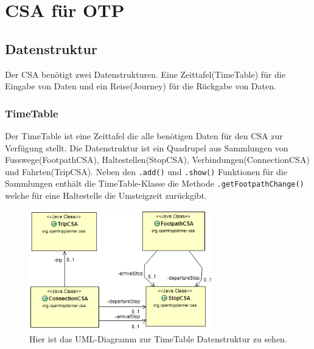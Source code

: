 \section{CSA für OTP}

\subsection{Datenstruktur}
Der CSA benötigt zwei Datenstrukturen. Eine Zeittafel(TimeTable) für die Eingabe von Daten und ein Reise(Journey) für die Rückgabe von Daten. 

\subsubsection{TimeTable}
Der TimeTable ist eine Zeittafel die alle benötigen Daten für den CSA zur Verfügung stellt. Die Datenstruktur ist ein Quadrupel aus Sammlungen von Fusswege(FootpathCSA), Haltestellen(StopCSA), Verbindungen(ConnectionCSA) und Fahrten(TripCSA).\newline 
Neben den \texttt{.add()} und \texttt{.show()} Funktionen für die Sammlungen enthält die TimeTable-Klasse die Methode \texttt{.getFootpathChange()} welche für eine Haltestelle die Umsteigzeit zurückgibt.

\begin{figure}[htb]
	\centering
	\includegraphics[width=8cm]{img/UML-TimeTable.png}
	\caption{Hier ist das UML-Diagramm zur TimeTable Datenstruktur zu sehen.}
	\label{fig:uml-timetable}
\end{figure}

